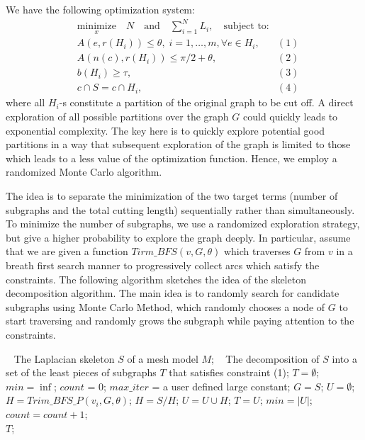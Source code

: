 We have the following optimization system:
\begin{equation*}
\begin{aligned}
& \underset{x}{\text{minimize}} \quad N \quad \text{and} \quad \sum_{i=1}^N{L_i},
\quad \text{subject to:} \\
& A(e, r(H_i)) \leq \theta, \; i = 1, \ldots, m, \forall e \in H_i, & (1)\\
& A(n(c), r(H_i)) \leq \pi/2+ \theta, & (2)\\
& b(H_i) \geq \tau, & (3)\\
& c \cap S = c \cap H_i, & (4)
\end{aligned}
\end{equation*}
where all $H_i$-s constitute a partition of the original graph to be cut off. A direct exploration of all possible partitions over the graph $G$ could quickly leads to exponential complexity. The key here is to quickly explore potential good partitions in a way that subsequent exploration of the graph is limited to those which leads to a less value of the optimization function. Hence, we employ a randomized Monte Carlo algorithm.

The idea is to separate the minimization of the two target terms (number of subgraphs and the total cutting length) sequentially rather than simultaneously. To minimize the number of subgraphs, we use a randomized exploration strategy, but give a higher probability to explore the graph deeply. In particular, assume that we are given a function $Tirm\_BFS(v, G, \theta)$ which traverses $G$ from $v$ in a breath first search manner to progressively collect arcs which satisfy the constraints. The following algorithm sketches the idea of the skeleton decomposition algorithm. The main idea is to randomly search for candidate subgraphs using Monte Carlo Method, which randomly chooses a node of $G$ to start traversing and randomly grows the subgraph while paying attention to the constraints.

\begin{algorithm}
\caption{$SkeletonMeshDecomposition(S, M)$}
\label{alg:Framwork}
\begin{algorithmic}[1]
\REQUIRE~
The Laplacian skeleton $S$ of a mesh model $M$;
\ENSURE~
The decomposition of $S$ into a set of the least pieces of subgraphs $T$ that satisfies constraint (1);
\STATE $T = \emptyset$; $min = \inf$; $count$ = 0; $max\_iter$ = a user defined large constant;
\STATE  $G=S$; $U= \emptyset$;
\STATE $H = Trim\_BFS\_P(v_i, G, \theta)$;
\STATE $H = S / H$;
\STATE $U = U \cup H$;
\STATE $T = U$;
\STATE  $min = | U | $;
\ENDIF
\ENDFOR
\ENDWHILE
\STATE $count =count + 1$;
\ENDWHILE
\label{code:fram:select} \\
\RETURN $T$;
\end{algorithmic}
\end{algorithm}


